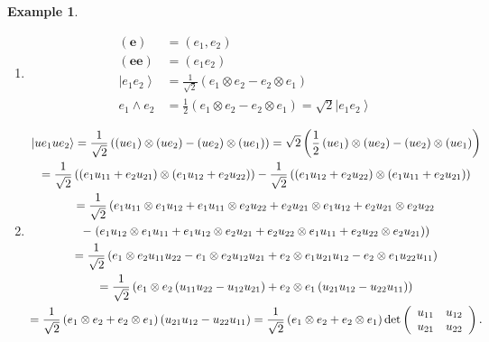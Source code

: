 \documentclass[aps,preprint]{revtex4}%
\newtheorem{example}[theorem]{Example}
\begin{document}
\begin{enumerate}
\begin{example}
\begin{enumerate}
\item
\begin{align}
\left(  \mathbf{e}\right)   &  =\left(  e_{1},e_{2}\right) \\
\left(  \mathbf{ee}\right)   &  =\left(  e_{1}e_{2}\right) \\
\left\vert e_{1}e_{2}\right\rangle  &  =\frac{1}{\sqrt{2}}\left(  e_{1}\otimes
e_{2}-e_{2}\otimes e_{1}\right) \\
e_{1}\wedge e_{2}  &  =\frac{1}{2}\left(  e_{1}\otimes e_{2}-e_{2}\otimes
e_{1}\right)  =\sqrt{2}\left\vert e_{1}e_{2}\right\rangle
\end{align}


\item
\begin{gather}
\left\vert ue_{1}ue_{2}\right\rangle =\frac{1}{\sqrt{2}}\left(  \left(
ue_{1}\right)  \otimes\left(  ue_{2}\right)  -\left(  ue_{2}\right)
\otimes\left(  ue_{1}\right)  \right)  =\sqrt{2}\left(  \frac{1}{2}\left(
ue_{1}\right)  \otimes\left(  ue_{2}\right)  -\left(  ue_{2}\right)
\otimes\left(  ue_{1}\right)  \right) \\
=\frac{1}{\sqrt{2}}\left(  \left(  e_{1}u_{11}+e_{2}u_{21}\right)
\otimes\left(  e_{1}u_{12}+e_{2}u_{22}\right)  \right)  -\frac{1}{\sqrt{2}%
}\left(  \left(  e_{1}u_{12}+e_{2}u_{22}\right)  \otimes\left(  e_{1}%
u_{11}+e_{2}u_{21}\right)  \right) \\
=\frac{1}{\sqrt{2}}\left(  e_{1}u_{11}\otimes e_{1}u_{12}+e_{1}u_{11}\otimes
e_{2}u_{22}+e_{2}u_{21}\otimes e_{1}u_{12}+e_{2}u_{21}\otimes e_{2}%
u_{22}\right. \\
-\left.  \left(  e_{1}u_{12}\otimes e_{1}u_{11}+e_{1}u_{12}\otimes e_{2}%
u_{21}+e_{2}u_{22}\otimes e_{1}u_{11}+e_{2}u_{22}\otimes e_{2}u_{21}\right)
\right) \\
=\frac{1}{\sqrt{2}}\left(  e_{1}\otimes e_{2}u_{11}u_{22}-e_{1}\otimes
e_{2}u_{12}u_{21}+e_{2}\otimes e_{1}u_{21}u_{12}-e_{2}\otimes e_{1}%
u_{22}u_{11}\right) \\
=\frac{1}{\sqrt{2}}\left(  e_{1}\otimes e_{2}\left(  u_{11}u_{22}-u_{12}%
u_{21}\right)  +e_{2}\otimes e_{1}\left(  u_{21}u_{12}-u_{22}u_{11}\right)
\right) \\
=\frac{1}{\sqrt{2}}\left(  e_{1}\otimes e_{2}+e_{2}\otimes e_{1}\right)
\left(  u_{21}u_{12}-u_{22}u_{11}\right)  =\frac{1}{\sqrt{2}}\left(
e_{1}\otimes e_{2}+e_{2}\otimes e_{1}\right)  \det\left(
\begin{array}
[c]{cc}%
u_{11} & u_{12}\\
u_{21} & u_{22}%
\end{array}
\right)  .
\end{gather}


\end{enumerate}
\end{example}
\end{enumerate}
\end{document}
